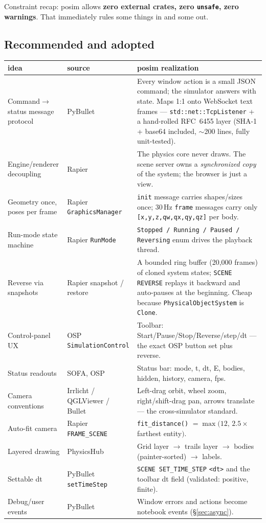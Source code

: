 \documentclass[11pt]{article}
\newcommand{\kw}[1]{\texttt{\uppercase{#1}}}
\newcommand{\code}[1]{\texttt{#1}}
\begin{document}
Constraint recap: posim allows \textbf{zero external crates, zero
\code{unsafe}, zero warnings}. That immediately rules some things in
and some out.

\subsection{Recommended and adopted}

\begin{center}\small
\begin{tabular}{p{3.4cm}p{2.6cm}p{8.2cm}}
\textbf{idea} & \textbf{source} & \textbf{posim realization}\\\hline
Command$\to$status message protocol & PyBullet & Every window action is a small JSON command; the simulator answers with state. Maps 1:1 onto WebSocket text frames --- \code{std::net::TcpListener} + a hand-rolled RFC~6455 layer (SHA-1 + base64 included, $\sim$200 lines, fully unit-tested).\\
Engine/renderer decoupling & Rapier & The physics core never draws. The scene server owns a \emph{synchronized copy} of the system; the browser is just a view.\\
Geometry once, poses per frame & Rapier \code{GraphicsManager} & \code{init} message carries shapes/sizes once; 30\,Hz \code{frame} messages carry only \code{[x,y,z,qw,qx,qy,qz]} per body.\\
Run-mode state machine & Rapier \code{RunMode} & \code{Stopped / Running / Paused / Reversing} enum drives the playback thread.\\
Reverse via snapshots & Rapier snapshot / restore & A bounded ring buffer (20{,}000 frames) of cloned system states; \kw{scene reverse} replays it backward and auto-pauses at the beginning. Cheap because \code{PhysicalObjectSystem} is \code{Clone}.\\
Control-panel UX & OSP \code{SimulationControl} & Toolbar: Start/Pause/Stop/Reverse/step/dt --- the exact OSP button set plus reverse.\\
Status readouts & SOFA, OSP & Status bar: mode, t, dt, E, bodies, hidden, history, camera, fps.\\
Camera conventions & Irrlicht / QGLViewer / Bullet & Left-drag orbit, wheel zoom, right/shift-drag pan, arrows translate --- the cross-simulator standard.\\
Auto-fit camera & Rapier \code{FRAME\_SCENE} & \code{fit\_distance()} $=\max(12,\,2.5\times$ farthest entity$)$.\\
Layered drawing & PhysicsHub & Grid layer $\to$ trails layer $\to$ bodies (painter-sorted) $\to$ labels.\\
Settable dt & PyBullet \code{setTimeStep} & \kw{scene set\_time\_step} \code{<dt>} and the toolbar dt field (validated: positive, finite).\\
Debug/user events & PyBullet & Window errors and actions become notebook events (\S\ref{sec:async}).\\
\end{tabular}
\end{center}
\end{document}

